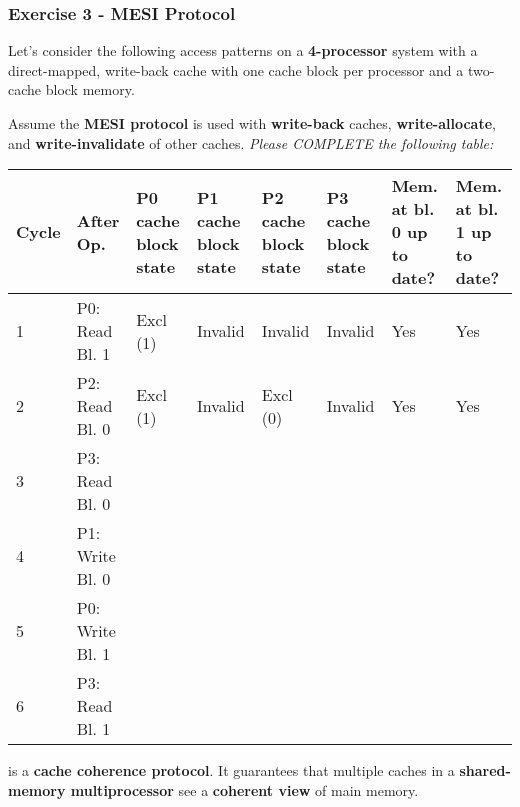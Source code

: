 \newpage

\subsubsection*{Exercise 3 - MESI Protocol}

Let's consider the following access patterns on a \textbf{4-processor} system with a direct-mapped, write-back cache with one cache block per processor and a two-cache block memory.

\highspace
Assume the \textbf{MESI protocol} is used with \textbf{write-back} caches, \textbf{write-allocate}, and \textbf{write-invalidate} of other caches. \emph{Please COMPLETE the following table:}

\begin{table}[!htp]
    \centering
    \begin{adjustbox}{width={\textwidth},totalheight={\textheight},keepaspectratio}
        \begin{tabular}{@{} l l p{4em} p{4em} p{4em} p{4em} p{3em} p{3em} @{}}
            \toprule
            \textbf{Cycle} & \textbf{After Op.} & \textbf{P0 cache block state} & \textbf{P1 cache block state} & \textbf{P2 cache block state} & \textbf{P3 cache block state} & \textbf{Mem. at bl. 0 up to date?} & \textbf{Mem. at bl. 1 up to date?} \\
            \midrule
            1   & P0: Read Bl. 1    & Excl (1)  & Invalid   & Invalid   & Invalid   & Yes   & Yes   \\ [.3em]
            2   & P2: Read Bl. 0    & Excl (1)  & Invalid   & Excl (0)  & Invalid   & Yes   & Yes   \\ [.3em]
            3   & P3: Read Bl. 0    &           &           &           &           &       &       \\ [.3em]
            4   & P1: Write Bl. 0   &           &           &           &           &       &       \\ [.3em]
            5   & P0: Write Bl. 1   &           &           &           &           &       &       \\ [.3em]
            6   & P3: Read Bl. 1    &           &           &           &           &       &       \\
            \bottomrule
        \end{tabular}
    \end{adjustbox}
\end{table}

\noindent
\answer {} is a \textbf{cache coherence protocol}. It guarantees that multiple caches in a \textbf{shared-memory multiprocessor} see a \textbf{coherent view} of main memory.


